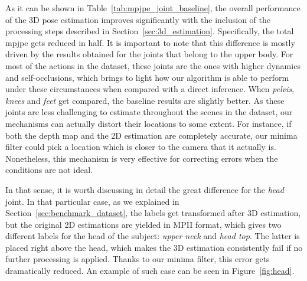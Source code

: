 As it can be shown in Table~\ref{tab:mpjpe_joint_baseline}, the overall performance of the 3D pose estimation improves significantly with the inclusion of the processing steps described in Section~\ref{sec:3d_estimation}. Specifically, the total \gls{mpjpe} gets reduced in half. It is important to note that this difference is mostly driven by the results obtained for the joints that belong to the upper body. For most of the actions in the dataset, these joints are the ones with higher dynamics and self-occlusions, which brings to light how our algorithm is able to perform under these circumstances when compared with a direct inference. When \textit{pelvis}, \textit{knees} and \textit{feet} get compared, the baseline results are slightly better. As these joints are less challenging to estimate throughout the scenes in the dataset, our mechanisms can actually distort their locations to some extent. For instance, if both the depth map and the 2D estimation are completely accurate, our minima filter could pick a location which is closer to the camera that it actually is. Nonetheless, this mechanism is very effective for correcting errors when the conditions are not ideal.

\begin{table}[!ht]  
  \centering
  \caption{Quantitative 3D pose estimation results on BMHAD per joint, compared against our baseline, using as figure of merit MPJPE (mm). Values in bold correspond to the best results achieved for each category.}
  \label{tab:mpjpe_joint_baseline}
\end{table}

In that sense, it is worth discussing in detail the great difference for the \textit{head} joint. In that particular case, as we explained in Section~\ref{sec:benchmark_dataset}, the labels get transformed after 3D estimation, but the original 2D estimations are yielded in MPII format, which gives two different labels for the head of the subject: \textit{upper neck} and \textit{head top}. The latter is placed right above the head, which makes the 3D estimation consistently fail if no further processing is applied. Thanks to our minima filter, this error gets dramatically reduced. An example of such case can be seen in Figure~\ref{fig:head}.

